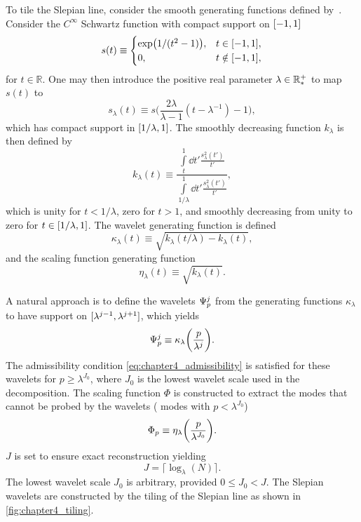 To tile the Slepian line, consider the smooth generating functions defined by~\cite{Wiaux2008}.
Consider the \(C^{\infty}\) Schwartz function with compact support on \(\interval{-1}{1}\)
%
\begin{equation}
	s(t) \equiv
	\begin{cases}
		\exp(1/(t^{2}-1)), & t \in \interval{-1}{1},    \\
		0,                 & t \notin \interval{-1}{1},
	\end{cases}
\end{equation}
%
for \(t \in \mathbb{R}\).
One may then introduce the positive real parameter \(\lambda \in \mathbb{R}_{\ast}^{+}{}\) to map \(s(t)\) to
%
\begin{equation}
	s_{\lambda}(t)
	\equiv s\bigg(\frac{2\lambda}{\lambda-1}(t-\lambda^{-1}) - 1\bigg),
\end{equation}
%
which has compact support in \(\interval{1/\lambda}{1}\).
The smoothly decreasing function \(k_{\lambda}\) is then defined by
%
\begin{equation}\label{eq:chapter4_k_lambda}
	k_{\lambda}(t)
	\equiv \frac{\displaystyle\int\limits_{t}^{1} \dd{t'} \frac{s^{2}_{\lambda}(t')}{t'}}
	{\displaystyle\int\limits_{1/\lambda}^{1} \dd{t'} \frac{s^{2}_{\lambda}(t')}{t'}},
\end{equation}
%
which is unity for \(t < 1/\lambda{}\), zero for \(t > 1\), and smoothly decreasing from unity to zero for \(t \in \interval{1/\lambda}{1}\).
The wavelet generating function is defined
%
\begin{equation}
	\kappa_{\lambda}(t)
	\equiv \sqrt{k_{\lambda}(t/\lambda) - k_{\lambda}(t)},
\end{equation}
%
and the scaling function generating function
%
\begin{equation}
	\eta_{\lambda}(t)
	\equiv \sqrt{k_{\lambda}(t)}.
\end{equation}

A natural approach is to define the wavelets \({\Psi}_{p}^{j}\) from the generating functions \(\kappa_{\lambda}\) to have support on \(\interval{\lambda^{j-1}}{\lambda^{j+1}}\), which yields
%
\begin{equation}
	{\Psi}_{p}^{j}
	\equiv \kappa_{\lambda}\bigg(\frac{p}{\lambda^{j}}\bigg).
\end{equation}
%
The admissibility condition \cref{eq:chapter4_admissibility} is satisfied for these wavelets for \(p \geq \lambda^{J_{0}}\), where \(J_{0}\) is the lowest wavelet scale used in the decomposition.
The scaling function \(\Phi{}\) is constructed to extract the modes that cannot be probed by the wavelets (\ie{} modes with \(p < \lambda^{J_{0}}\))
%
\begin{equation}
	{\Phi}_{p}
	\equiv \eta_{\lambda}\bigg(\frac{p}{\lambda^{J_{0}}}\bigg).
\end{equation}
%
\(J\) is set to ensure exact reconstruction yielding
%
\begin{equation}
	J = \lceil{} \log_{\lambda}(N)\rceil{}.
\end{equation}
%
The lowest wavelet scale \(J_{0}\) is arbitrary, provided \(0 \leq J_{0} < J\).
The Slepian wavelets are constructed by the tiling of the Slepian line as shown in \cref{fig:chapter4_tiling}.

